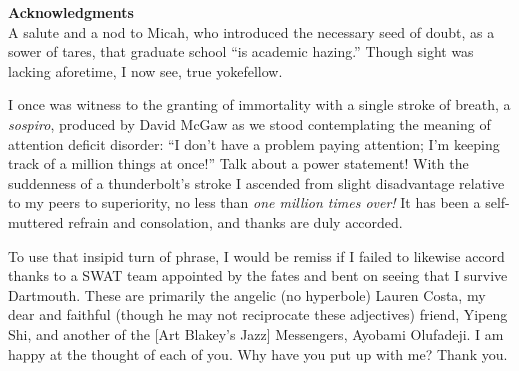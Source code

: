 
{\Huge \bf Acknowledgments} \\

A salute and a nod to Micah, who introduced the necessary seed of
doubt, as a sower of tares, that graduate school ``is academic
hazing.''  Though sight was lacking aforetime, I now see, true
yokefellow.

I once was witness to the granting of immortality with a single stroke
of breath, a \textsl{sospiro}, produced by David McGaw as we stood
contemplating the meaning of attention deficit disorder: ``I don't
have a problem paying attention; I'm keeping track of a million things
at once!''  Talk about a power statement! With the suddenness of a
thunderbolt's stroke I ascended from slight disadvantage relative to
my peers to superiority, no less than \emph{one million times over!}
It has been a self-muttered refrain and consolation, and thanks are
duly accorded.

To use that insipid turn of phrase, I would be remiss if I failed to
likewise accord thanks to a SWAT team appointed by the fates and bent
on seeing that I survive Dartmouth. These are primarily the angelic
(no hyperbole) Lauren Costa, my dear and faithful (though he may not
reciprocate these adjectives) friend, Yipeng Shi, and another of the
[Art Blakey's Jazz] Messengers, Ayobami Olufadeji. I am happy at the
thought of each of you. Why have you put up with me? Thank you.

